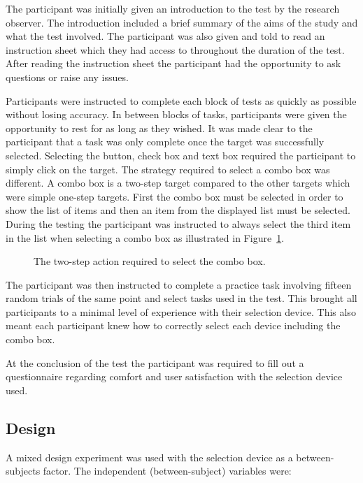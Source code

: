 \documentclass{elsart}
\begin{document}
The participant was initially given an introduction to the test by the
research observer. The introduction included a brief summary of the aims
of the study and what the test involved. The participant was also given
and told to read an instruction sheet which they had access to
throughout the duration of the test. After reading the instruction sheet
the participant had the opportunity to ask questions or raise any
issues.

Participants were instructed to complete each block of tests as quickly
as possible without losing accuracy. In between blocks of tasks,
participants were given the opportunity to rest for as long as they
wished. It was made clear to the participant that a task was only
complete once the target was successfully selected. Selecting the
button, check box and text box required the participant to simply click
on the target. The strategy required to select a combo box was
different. A combo box is a two-step target compared to the other
targets which were simple one-step targets. First the combo box must be
selected in order to show the list of items and then an item from the
displayed list must be selected. During the testing the participant was
instructed to always select the third item in the list when selecting a
combo box as illustrated in Figure~\ref{fig-combo-box}.

\begin{figure}
	\caption{The two-step action required to select the combo box.}
	\label{fig-combo-box}
\end{figure}

The participant was then instructed to complete a practice task
involving fifteen random trials of the same point and select tasks used
in the test. This brought all participants to a minimal level of
experience with their selection device. This also meant each participant
knew how to correctly select each device including the combo box.

At the conclusion of the test the participant was required to fill out a
questionnaire regarding comfort and user satisfaction with the selection
device used.

\subsection{Design}
\label{sec-method-design}

A mixed design experiment was used with the selection device as a
between-subjects factor. The independent (between-subject) variables
were:
\end{document}
